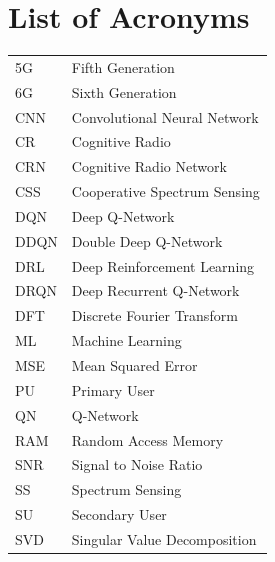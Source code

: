 \chapter*{List of Acronyms}



\begin{longtable}{ll}



5G & Fifth Generation \\
6G & Sixth Generation \\
CNN & Convolutional Neural Network\\
CR & Cognitive Radio \\
CRN & Cognitive Radio Network \\
CSS & Cooperative Spectrum Sensing \\
DQN & Deep Q-Network \\
DDQN & Double Deep Q-Network \\
DRL & Deep Reinforcement Learning \\
DRQN & Deep Recurrent Q-Network \\
DFT & Discrete Fourier Transform \\
ML & Machine Learning \\
MSE & Mean Squared Error \\
PU & Primary User \\
QN & Q-Network\\
RAM & Random Access Memory \\ 
SNR & Signal to Noise Ratio \\
SS & Spectrum Sensing \\
SU & Secondary User \\
SVD & Singular Value Decomposition \\









     






















































\end{longtable}
